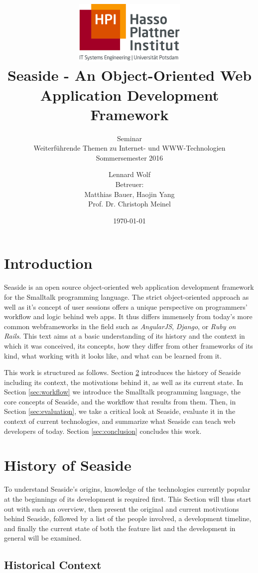 \documentclass[a4paper,12pt,pagesize,headsepline,oribibl,titlepage]{scrartcl}
\title{
	\includegraphics*[width=0.4\textwidth]{hpi_logo.png}\\
	\vspace{24pt}
	 Seaside - An Object-Oriented Web Application Development Framework
}
\subtitle{
	Seminar\\
	Weiterführende Themen zu Internet- und WWW-Technologien\\
	Sommersemester 2016
}
\author{
	Lennard Wolf\\[12pt]
	Betreuer:\\
	Matthias Bauer, Haojin Yang\\
	Prof. Dr. Christoph Meinel
}
\date{\today}
\begin{document}
\maketitle
\tableofcontents
\newpage

\section{Introduction}
Seaside is an open source object-oriented web application development framework for the Smalltalk programming language. The strict object-oriented approach as well as it's concept of user sessions offers a unique perspective on programmers' workflow and logic behind web apps. It thus differs immensely from today's more common webframeworks in the field such as \emph{AngularJS}, \emph{Django}, or \emph{Ruby on Rails}. This text aims at a basic understanding of its history and the context in which it was conceived, its concepts, how they differ from other frameworks of its kind, what working with it looks like, and what can be learned from it. 
\medskip

This work is structured as follows. Section \ref{sec:history} introduces the history of Seaside including its context, the motivations behind it, as well as its current state. In Section \ref{sec:workflow} we introduce the Smalltalk programming language, the core concepts of Seaside, and the workflow that results from them. Then, in Section \ref{sec:evaluation}, we take a critical look at Seaside, evaluate it in the context of current technologies, and summarize what Seaside can teach web developers of today. Section \ref{sec:conclusion} concludes this work.


\section{History of Seaside}
\label{sec:history}
To understand Seaside's origins, knowledge of the technologies currently popular at the beginnings of its development is required first. This Section will thus start out with such an overview, then present the original and current motivations behind Seaside, followed by a list of the people involved, a development timeline, and finally the current state of both the feature list and the development in general will be examined.

\subsection{Historical Context}
\label{sec:context} 
\end{document}
